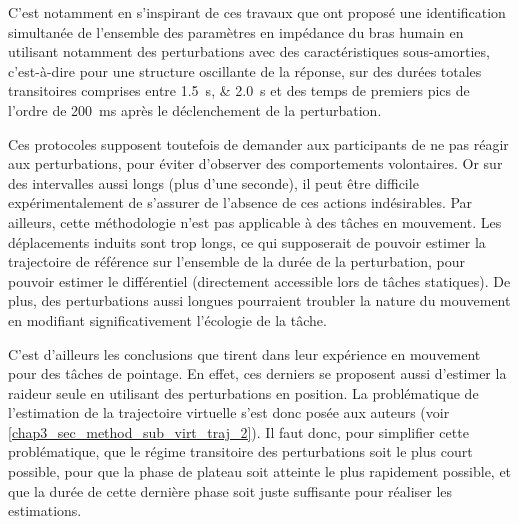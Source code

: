 C'est notamment en s'inspirant de ces travaux que \textcite{dolan_dynamic_1993} ont proposé une identification simultanée de l'ensemble des paramètres en impédance du bras humain en utilisant notamment des perturbations avec des caractéristiques sous-amorties, c'est-à-dire pour une structure oscillante de la réponse, sur des durées totales transitoires comprises entre \SIlist{1.5;2.0}{\second} et des temps de premiers pics de l'ordre de \SI{200}{\milli\second} après le déclenchement de la perturbation.

Ces protocoles supposent toutefois de demander aux participants de ne pas réagir aux perturbations, pour éviter d'observer des comportements volontaires. Or sur des intervalles aussi longs (plus d'une seconde), il peut être difficile expérimentalement de s'assurer de l'absence de ces actions indésirables. Par ailleurs, cette méthodologie n'est pas applicable à des tâches en mouvement. Les déplacements induits sont trop longs, ce qui supposerait de pouvoir estimer la trajectoire de référence sur l'ensemble de la durée de la perturbation, pour pouvoir estimer le différentiel (directement accessible lors de tâches statiques). De plus, des perturbations aussi longues pourraient troubler la nature du mouvement en modifiant significativement l'écologie de la tâche.

C'est d'ailleurs les conclusions que tirent \textcite{burdet_method_2000} dans leur expérience en mouvement pour des tâches de pointage. En effet, ces derniers se proposent aussi d'estimer la raideur seule en utilisant des perturbations en position. La problématique de l'estimation de la trajectoire virtuelle s'est donc posée aux auteurs (voir \cref{chap3_sec_method_sub_virt_traj_2}). Il faut donc, pour simplifier cette problématique, que le régime transitoire des perturbations soit le plus court possible, pour que la phase de plateau soit atteinte le plus rapidement possible, et que la durée de cette dernière phase soit juste suffisante pour réaliser les estimations. 

